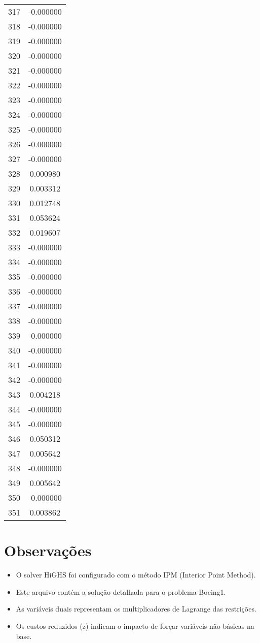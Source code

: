 \documentclass[12pt]{article}
\begin{document}
\begin{longtable}{@{}cc@{}}
317 & -0.000000 \\
318 & -0.000000 \\
319 & -0.000000 \\
320 & -0.000000 \\
321 & -0.000000 \\
322 & -0.000000 \\
323 & -0.000000 \\
324 & -0.000000 \\
325 & -0.000000 \\
326 & -0.000000 \\
327 & -0.000000 \\
328 & 0.000980 \\
329 & 0.003312 \\
330 & 0.012748 \\
331 & 0.053624 \\
332 & 0.019607 \\
333 & -0.000000 \\
334 & -0.000000 \\
335 & -0.000000 \\
336 & -0.000000 \\
337 & -0.000000 \\
338 & -0.000000 \\
339 & -0.000000 \\
340 & -0.000000 \\
341 & -0.000000 \\
342 & -0.000000 \\
343 & 0.004218 \\
344 & -0.000000 \\
345 & -0.000000 \\
346 & 0.050312 \\
347 & 0.005642 \\
348 & -0.000000 \\
349 & 0.005642 \\
350 & -0.000000 \\
351 & 0.003862 \\

\end{longtable}


\section{Observações}

\begin{itemize}
\item O solver HiGHS foi configurado com o método IPM (Interior Point Method).
\item Este arquivo contém a solução detalhada para o problema Boeing1.
\item As variáveis duais representam os multiplicadores de Lagrange das restrições.
\item Os custos reduzidos (z) indicam o impacto de forçar variáveis não-básicas na base.
\end{itemize}
\end{document}
